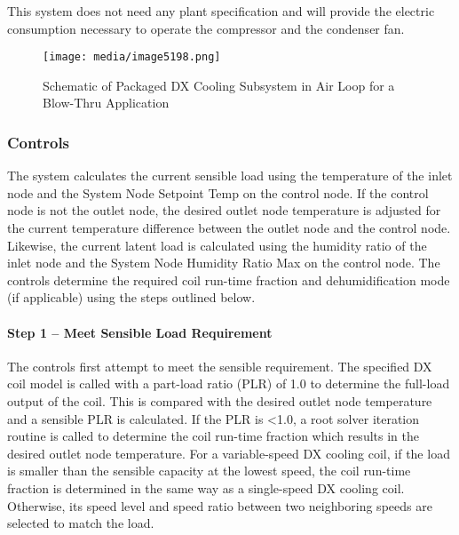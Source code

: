 This system does not need any plant specification and will provide the electric consumption necessary to operate the compressor and the condenser fan.

\begin{figure}[hbtp] %
\centering
\texttt{[image: media/image5198.png]}
\caption{Schematic of Packaged DX Cooling Subsystem in Air Loop for a Blow-Thru Application \protect \label{fig:schematic-of-packaged-dx-cooling-subsystem-in}}
\end{figure}

\subsubsection{Controls}\label{controls-1}

The system calculates the current sensible load using the temperature of the inlet node and the System Node Setpoint Temp on the control node. If the control node is not the outlet node, the desired outlet node temperature is adjusted for the current temperature difference between the outlet node and the control node. Likewise, the current latent load is calculated using the humidity ratio of the inlet node and the System Node Humidity Ratio Max on the control node. The controls determine the required coil run-time fraction and dehumidification mode (if applicable) using the steps outlined below.

\paragraph{Step 1 -- Meet Sensible Load Requirement}\label{step-1-meet-sensible-load-requirement-1}

The controls first attempt to meet the sensible requirement. The specified DX coil model is called with a part-load ratio (PLR) of 1.0 to determine the full-load output of the coil. This is compared with the desired outlet node temperature and a sensible PLR is calculated. If the PLR is \textless{}1.0, a root solver iteration routine is called to determine the coil run-time fraction which results in the desired outlet node temperature. For a variable-speed DX cooling coil, if the load is smaller than the sensible capacity at the lowest speed, the coil run-time fraction is determined in the same way as a single-speed DX cooling coil. Otherwise, its speed level and speed ratio between two neighboring speeds are selected to match the load.

